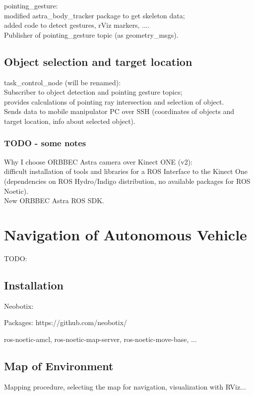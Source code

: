 pointing\_gesture:\\
modified astra\_body\_tracker package to get skeleton data;\\
added code to detect gestures, rViz markers, ....\\

Publisher of pointing\_gesture topic (as geometry\_msgs).\\


\subsection{Object selection and target location}
task\_control\_node (will be renamed):\\
Subscriber to object detection and pointing gesture topics;\\
provides calculations of pointing ray intersection and selection of object.\\
Sends data to mobile manipulator PC over SSH (coordinates of objects and target location, info about selected object).\\

\subsubsection{TODO - some notes}
Why I choose ORBBEC Astra camera over Kinect ONE (v2):\\
difficult installation of tools and libraries for a ROS Interface to the Kinect One (dependencies on ROS Hydro/Indigo distribution, no available packages for ROS Noetic).\\
New ORBBEC Astra ROS SDK.\\

\section{Navigation of Autonomous Vehicle}
TODO:\\
\subsection{Installation}
Neobotix:

Packages:
https://github.com/neobotix/

ros-noetic-amcl, ros-noetic-map-server, ros-noetic-move-base, ...

\subsection{Map of Environment}
Mapping procedure, selecting the map for navigation, visualization with RViz...\\

